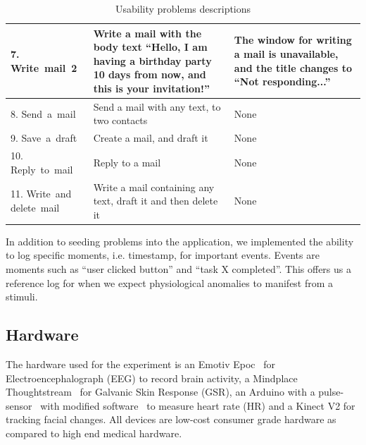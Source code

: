 \begin{table}[H]
\begin{tabular}[c]{|p{60pt}|p{80pt}|p{80pt}|}
    \small{7. Write~mail~2}           & \small{Write a mail with the body text ``Hello, I am having a birthday party 10 days from now, and this is your invitation!''} & \small{The window for writing a mail is unavailable, and the title changes to ``Not responding...''}                                                \\ \hline
    \small{8. Send~a~mail}            & \small{Send a mail with any text, to two contacts}                                                                             & \small{None}                                                                                                                                        \\ \hline
    \small{9. Save~a~draft}           & \small{Create a mail, and draft it}                                                                                            & \small{None}                                                                                                                                        \\ \hline
    \small{10. Reply~to~mail}         & \small{Reply to a mail}                                                                                                        & \small{None}                                                                                                                                        \\ \hline
    \small{11. Write~and delete~mail} & \small{Write a mail containing any text, draft it and then delete it}                                                          & \small{None}                                                                                                                                        \\ \hline
  \end{tabular}
  \caption{Usability problems descriptions}
  \label{tab:ups-desc}
\end{table}

In addition to seeding problems into the application, we implemented the ability to log specific moments, i.e. timestamp,
for important events. Events are moments such as ``user clicked button'' and ``task X completed''. This offers us a
reference log for when we expect physiological anomalies to manifest from a stimuli.

\subsection{Hardware}
The hardware used for the experiment is an Emotiv Epoc~\cite{emotiv_epoc_website} for Electroencephalograph (EEG) to record brain activity, a Mindplace Thoughtstream~\cite{thoughtstream} for Galvanic Skin Response (GSR), an Arduino with a pulse-sensor~\cite{pulsesensor} with modified software~\cite{pulsesensorgit} to measure heart rate (HR) and a Kinect V2\cite{kinect_specs3} for tracking facial changes.
All devices are low-cost consumer grade hardware as compared to high end medical hardware.

